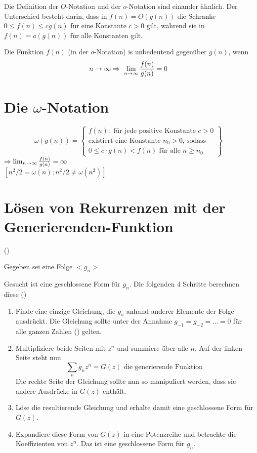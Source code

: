 \documentclass[a4paper]{scrartcl}
\begin{document}
Die Definition der $O$-Notation und der $o$-Notation sind einander ähnlich. Der Unterschied besteht darin, dass in $f(n)=O(g(n))$ die
Schranke $0 \leq f(n) \leq cg(n)$ für eine Konstante $c>0$ gilt, während sie in $f(n) = o(g(n))$ für alle Konstanten gilt.

Die Funktion $f(n)$ (in der $o$-Notation) is unbedeutend gegenüber $g(n)$, wenn
$$n \rightarrow \infty \Rightarrow\ \lim_{n \rightarrow \infty} \frac{f(n)}{g(n)}=0$$

\section{Die $\omega$-Notation}
$$\omega(g(n)) = \left\{ 
\begin{array}{l}
	f(n) : \text{ für jede positive Konstante }c>0  \\
	\text{existiert eine Konstante $n_0>0$, sodass }\\
	0\leq c \cdot g(n) < f(n) \text{ für alle } n \geq n_0
\end{array} \right\}$$
$\Rightarrow \lim_{n \rightarrow \infty} \frac{f(n)}{g(n)}=\infty$\\
$\left[ n^2/2 = \omega(n); n^2/2 \neq \omega(n^2) \right]$

\section{Lösen von Rekurrenzen mit der Generierenden-Funktion}
()
\begin{description}
	\item{Gegeben} sei eine Folge $<g_n>$
	\item{Gesucht} ist eine geschlossene Form für $g_n$. Die folgenden 4 Schritte berechnen diese ()
\end{description}
\begin{enumerate}
\item Finde eine einzige Gleichung, die $g_n$ anhand anderer Elemente der Folge ausdrückt. Die Gleichung sollte unter der Annahme
      $g_{-1}=g_{-2}= \ldots = 0$ für alle ganzen Zahlen (\MdZ) gelten.
\item Multipliziere beide Seiten mit $z^n$ und summiere über alle $n$. Auf der linken Seite steht nun
      $$\sum_{n}g_nz^n = G(z) \text{ die generierende Funktion}$$
      Die rechte Seite der Gleichung sollte nun so manipuliert werden, dass sie andere Ausdrücke in $G(z)$ enthält.
\item Löse die resultierende Gleichung und erhalte damit eine geschlossene Form für $G(z)$.
\item Expandiere diese Form von $G(z)$ in eine Potenzreihe und betrachte die Koeffizienten von $z^n$. Das ist eine geschlossene
      Form für $g_n$.
\end{enumerate}
\end{document}

